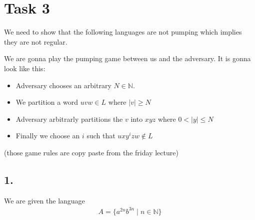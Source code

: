 \documentclass{article}
\begin{document}

\section*{Task 3}
We need to show that the following languages are not pumping which implies they are not regular.

We are gonna play the pumping game between us and the adversary. It is gonna look like this:
\begin{itemize}
   \item Adversary chooses an arbitrary \(N \in \mathbb{N}\).
   \item We partition a word \(uvw \in L\) where \(|v| \geq N\)
   \item Adversary arbitrarly partitions the \(v\) into \(xyz\) where \(0 < |y| \leq N\)
   \item Finally we choose an \(i\) such that \(uxy^izw \notin L\)
\end{itemize}
(those game rules are copy paste from the friday lecture)

\subsection*{1.}
We are given the language
\begin{align*}
   A = \{a^{2n} b^{3n} \mid n \in \mathbb{N}\}
\end{align*}
\end{document}
